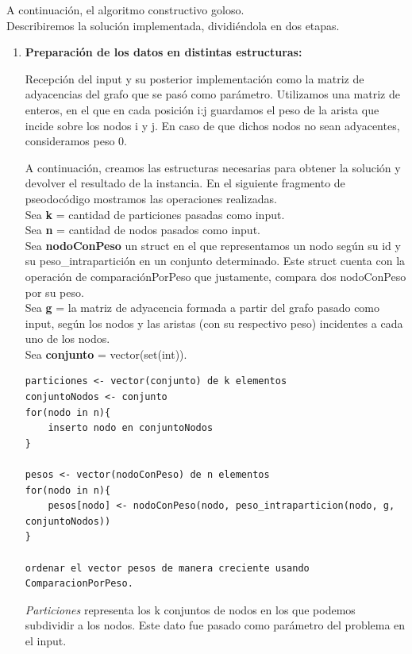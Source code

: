 A continuación, el algoritmo constructivo goloso.\\
Describiremos la solución implementada, dividiéndola en dos etapas.

\bigskip
\begin{enumerate}
\item


\textbf{Preparación de los datos en distintas estructuras:}

Recepción del input y su posterior implementación como la matriz de adyacencias del grafo que se pasó como parámetro. Utilizamos una matriz de enteros, en el que en cada posición i:j guardamos el peso de la arista que incide sobre los nodos i y j. En caso de que dichos nodos no sean adyacentes, consideramos peso 0.

A continuación, creamos las estructuras necesarias para obtener la solución y devolver el resultado de la instancia. En el siguiente fragmento de pseodocódigo mostramos las operaciones realizadas.\\

Sea \textbf{k} = cantidad de particiones pasadas como input.\\
Sea \textbf{n} = cantidad de nodos pasados como input.\\
Sea \textbf{nodoConPeso} un struct en el que representamos un nodo según su id y su peso\_intrapartición en un conjunto determinado. Este struct cuenta con la operación de comparaciónPorPeso que justamente, compara dos nodoConPeso por su peso.\\
Sea \textbf{g} = la matriz de adyacencia formada a partir del grafo pasado como input, según los nodos y las aristas (con su respectivo peso) incidentes a cada uno de los nodos.\\
Sea \textbf{conjunto} = vector(set(int)).\\
\newpage

\begin{lstlisting}[mathescape]
particiones <- vector(conjunto) de k elementos
conjuntoNodos <- conjunto
for(nodo in n){
	inserto nodo en conjuntoNodos
}

pesos <- vector(nodoConPeso) de n elementos
for(nodo in n){
	pesos[nodo] <- nodoConPeso(nodo, peso_intraparticion(nodo, g, conjuntoNodos))
}

ordenar el vector pesos de manera creciente usando ComparacionPorPeso.
\end{lstlisting}


\textit{Particiones} representa los k conjuntos de nodos en los que podemos subdividir a los nodos. Este dato fue pasado como parámetro del problema en el input.


\end{enumerate}
